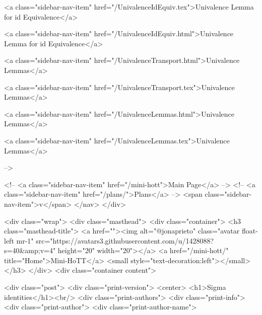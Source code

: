       
    
      
        
          <a class="sidebar-nav-item" href="/UnivalenceIdEquiv.tex">Univalence Lemma for id Equivalence</a>
        
      
    
      
        
          <a class="sidebar-nav-item" href="/UnivalenceIdEquiv.html">Univalence Lemma for id Equivalence</a>
        
      
    
      
        
          <a class="sidebar-nav-item" href="/UnivalenceTransport.html">Univalence Lemmas</a>
        
      
    
      
        
          <a class="sidebar-nav-item" href="/UnivalenceTransport.tex">Univalence Lemmas</a>
        
      
    
      
        
          <a class="sidebar-nav-item" href="/UnivalenceLemmas.html">Univalence Lemmas</a>
        
      
    
      
        
          <a class="sidebar-nav-item" href="/UnivalenceLemmas.tex">Univalence Lemmas</a>
        
      
     -->

    <!-- <a class="sidebar-nav-item" href="/mini-hott">Main Page</a> -->
    <!-- <a class="sidebar-nav-item" href="/plans/">Plans</a> -->
    <span class="sidebar-nav-item">v</span>
  </nav>
</div>

    <div class="wrap">
      <div class="masthead">
        <div class="container">
          <h3 class="masthead-title">
            <a href=""><img alt="@jonaprieto" class="avatar float-left mr-1" src="https://avatars3.githubusercontent.com/u/1428088?s=40&amp;v=4" height="20" width="20"></a>
            <a href="/mini-hott/" title="Home">Mini-HoTT</a>
            <small style="text-decoration:left"></small>
          </h3>
        </div>
      <div class="container content">
        







<div class="post">
  <div class="print-version">
    <center>
      <h1>Sigma identities</h1><br/>
        <div class="print-authors">
          <div class="print-info">
            <div class="print-author">
              <div class="print-author-name">
                

